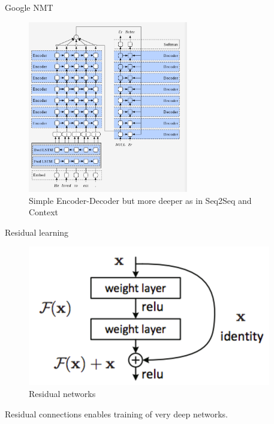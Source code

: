 ﻿\documentclass[aspectratio=43,mathserif,xcolor={usenames,dvipsnames,svgnames,table},10pt]{beamer}
\begin{document}
\begin{frame}{Google NMT}
 \begin{figure}[h]
    \includegraphics[height=7.5cm]{images/gnmt_1.png}  
    \caption{ Simple Encoder-Decoder but more deeper as in Seq2Seq and Context}
  \end{figure}
\end{frame}


\begin{frame}{Residual learning}
  \begin{figure}[h]
    \includegraphics[width=.9\linewidth]{images/residual.png}  
    \caption{ Residual networks}
  \end{figure}
  \vspace{-1cm}
  Residual connections enables training of very deep networks. 
\end{frame}
\end{document}
